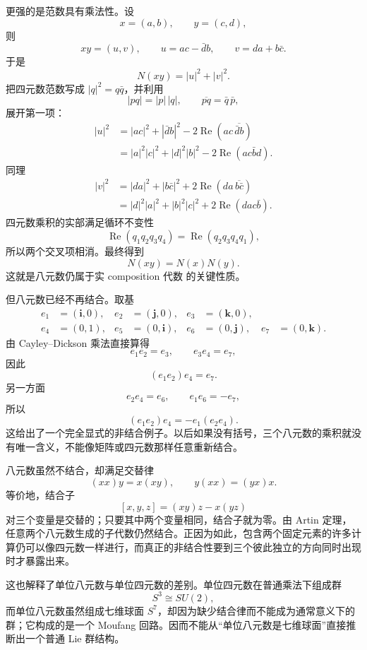 更强的是范数具有乘法性。设
\[
x=(a,b),\qquad y=(c,d),
\]
则
\[
xy=(u,v),
\qquad
u=ac-\bar d b,
\qquad
v=da+b\bar c.
\]
于是
\[
N(xy)=|u|^2+|v|^2.
\]
把四元数范数写成 $|q|^2=q\bar q$，并利用
\[
|pq|=|p|\,|q|,
\qquad
\overline{pq}=\bar q\,\bar p,
\]
展开第一项：
\[
\begin{aligned}
|u|^2
&=|ac|^2+|\bar d b|^2
-2\operatorname{Re}\!\left(ac\,\overline{\bar d b}\right)\\
&=|a|^2|c|^2+|d|^2|b|^2
-2\operatorname{Re}(ac\bar b d).
\end{aligned}
\]
同理
\[
\begin{aligned}
|v|^2
&=|da|^2+|b\bar c|^2
+2\operatorname{Re}\!\left(da\,\overline{b\bar c}\right)\\
&=|d|^2|a|^2+|b|^2|c|^2
+2\operatorname{Re}(da c\bar b).
\end{aligned}
\]
四元数乘积的实部满足循环不变性
\[
\operatorname{Re}(q_1q_2q_3q_4)
=\operatorname{Re}(q_2q_3q_4q_1),
\]
所以两个交叉项相消。最终得到
\begin{equation*}\boxed{
N(xy)=N(x)N(y).
}\end{equation*}
这就是八元数仍属于实 composition 代数 的关键性质。

但八元数已经不再结合。取基
\[
\begin{aligned}
e_1&=(\mathbf i,0),&
 e_2&=(\mathbf j,0),&
 e_3&=(\mathbf k,0),\\
e_4&=(0,1),&
 e_5&=(0,\mathbf i),&
 e_6&=(0,\mathbf j),&
 e_7&=(0,\mathbf k).
\end{aligned}
\]
由 Cayley--Dickson 乘法直接算得
\[
e_1e_2=e_3,
\qquad
e_3e_4=e_7,
\]
因此
\[
(e_1e_2)e_4=e_7.
\]
另一方面
\[
e_2e_4=e_6,
\qquad
e_1e_6=-e_7,
\]
所以
\begin{equation*}\boxed{
(e_1e_2)e_4=-e_1(e_2e_4).
}\end{equation*}
这给出了一个完全显式的非结合例子。以后如果没有括号，三个八元数的乘积就没有唯一含义，不能像矩阵或四元数那样任意重新结合。

八元数虽然不结合，却满足交替律
\[
(xx)y=x(xy),
\qquad
 y(xx)=(yx)x.
\]
等价地，结合子
\[
[x,y,z]=(xy)z-x(yz)
\]
对三个变量是交替的；只要其中两个变量相同，结合子就为零。由 Artin 定理，任意两个八元数生成的子代数仍然结合。正因为如此，包含两个固定元素的许多计算仍可以像四元数一样进行，而真正的非结合性要到三个彼此独立的方向同时出现时才暴露出来。

这也解释了单位八元数与单位四元数的差别。单位四元数在普通乘法下组成群
\[
S^3\cong SU(2),
\]
而单位八元数虽然组成七维球面 $S^7$，却因为缺少结合律而不能成为通常意义下的群；它构成的是一个 Moufang 回路。因而不能从“单位八元数是七维球面”直接推断出一个普通 Lie 群结构。

